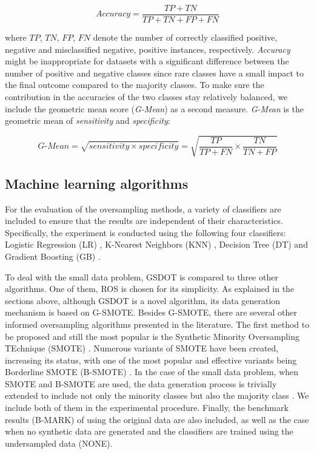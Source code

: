 \documentclass[10pt,letterpaper]{article}
\begin{document}
$$ \textit{Accuracy} = \frac{TP + TN}{TP +TN + FP + FN}$$

where \( TP \), \( TN \), \(FP \), \( FN\) denote the number of correctly classified positive, negative and misclassified negative, positive instances, respectively. \textit{Accuracy} might be inappropriate for datasets with a significant difference between the number of positive and negative classes since rare classes have a small impact to the final outcome compared to the majority classes. To make sure the contribution in the accuracies of the two classes stay relatively balanced, we include the geometric mean score (\textit{G-Mean}) as a second measure. \textit{G-Mean} is the geometric mean of \textit{sensitivity} and \textit{specificity}:

$$\textit{G-Mean} = \sqrt{sensitivity \times specificity} = \sqrt{\frac{TP}{TP + FN} \times \frac{TN}{TN + FP}}$$

\subsection{Machine learning algorithms}

For the evaluation of the oversampling methods, a variety of classifiers are included to ensure that the results are independent of their characteristics. Specifically, the experiment is conducted using the following four classifiers: Logistic Regression (LR) \cite{McCullagh.2019}, K-Nearest Neighbors (KNN) \cite{Cover.1967}, Decision Tree (DT) \cite{Salzberg.1994} and Gradient Boosting (GB) \cite{Friedman.2001}.

To deal with the small data problem, GSDOT is compared to three other algorithms. One of them, ROS is chosen for its simplicity. As explained in the sections above, although GSDOT is a novel algorithm, its data generation mechanism is based on G-SMOTE. Besides G-SMOTE, there are several other informed oversampling algorithms presented in the literature. The first method to be proposed and still the most popular is the Synthetic Minority Oversampling TEchnique (SMOTE) \cite{Chawla.2002}. Numerous variants of SMOTE have been created, increasing its status\cite{Fernandez.2018}, with one of the most popular and effective variants being Borderline SMOTE (B-SMOTE) \cite{Han.2005}. In the case of the small data problem, when SMOTE and B-SMOTE are used, the data generation process is trivially extended to include not only the minority classes but also the majority class \cite{Li.2018}. We include both of them in the experimental procedure. Finally, the benchmark results (B-MARK) of using the original data are also included, as well as the case when no synthetic data are generated and the classifiers are trained using the undersampled data (NONE).
\end{document}
